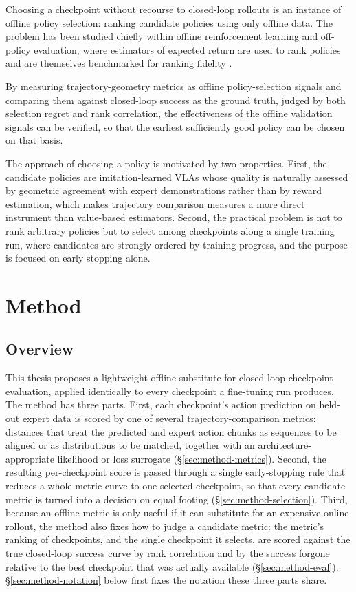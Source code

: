 \documentclass[english,12pt,a4paper,pdftex,elec,utf8]{aaltothesis}
\begin{document}
Choosing a checkpoint without recourse to closed-loop rollouts is an instance of offline policy selection: ranking candidate policies using only offline data. The problem has been studied chiefly within offline reinforcement learning and off-policy evaluation, where estimators of expected return are used to rank
policies and are themselves benchmarked for ranking fidelity \citep{paine2020hyperparameter, fu2021benchmarks}.

By measuring trajectory-geometry metrics as offline policy-selection signals and comparing them
against closed-loop success as the ground truth, judged by both selection regret and rank
correlation, the effectiveness of the offline validation signals can be verified, so that the
earliest sufficiently good policy can be chosen on that basis.

The approach of choosing a policy is motivated by two properties. First, the candidate policies are imitation-learned VLAs whose quality is naturally assessed by geometric agreement with expert demonstrations rather than by reward estimation, which makes trajectory comparison measures a more
direct instrument than value-based estimators. Second, the practical problem is not to rank arbitrary policies but to select among checkpoints along a single training run, where candidates are strongly ordered by training progress, and the purpose is focused on early stopping alone.

\section{Method}
\label{sec:method}

\subsection{Overview}
\label{sec:method-overview}

This thesis proposes a lightweight offline substitute for closed-loop checkpoint evaluation, applied identically to every checkpoint a fine-tuning run produces. The method has three parts. First, each checkpoint's action prediction on held-out expert data is scored by one of several trajectory-comparison metrics: distances that treat the predicted and expert action chunks as sequences to be aligned or as distributions to be matched, together with an architecture-appropriate likelihood or loss surrogate (\S\ref{sec:method-metrics}). Second, the resulting per-checkpoint score is passed through a single early-stopping rule that reduces a whole metric curve to one selected checkpoint, so that every candidate metric is turned into a decision on equal footing (\S\ref{sec:method-selection}). Third, because an offline metric is only useful if it can substitute for an expensive online rollout, the method also fixes how to judge a candidate metric: the metric's ranking of checkpoints, and the single checkpoint it selects, are scored against the true closed-loop success curve by rank correlation and by the success forgone relative to the best checkpoint that was actually available (\S\ref{sec:method-eval}). \S\ref{sec:method-notation} below first fixes the notation these three parts share.
\end{document}
